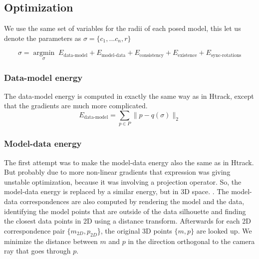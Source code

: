 \subsection{Optimization}

We use the same set of variables for the radii of each posed model, this let us denote the parameters as $\sigma = \{c_1, ... c_n, r\}$ 

\vspace{-5mm}

\begin{equation*}
\sigma =\underset{\sigma}{\operatorname{argmin}} \; E_\text{data-model} + E_\text{model-data} + E_\text{consistency} + E_\text{existence} + E_\text{sync-rotations}
\end{equation*}

\subsubsection{Data-model energy}
The data-model energy is computed in exactly the same way as in Htrack, except that the gradients are much more complicated.
\begin{equation*}
E_\text{data-model} = \underset{p\in P}\sum \| p - q(\sigma)\|_2
\end{equation*}

\subsubsection{Model-data energy}
The first attempt was to make the model-data energy also the same as in Htrack. But probably due to more non-linear gradients that expression was giving unstable optimization, because it was involving a projection operator. So, the model-data energy is replaced by a similar energy, but in 3D space. .
The model-data correspondences are also computed by rendering the model and the data, identifying the model points that are outside of the data silhouette and finding the closest data points in 2D using a distance transform. Afterwards for each 2D correspondence pair $\{m_{2D}, p_{2D}$\}, the original 3D points $\{m, p\}$ are looked up. We minimize the distance between $m$ and $p$ in the direction orthogonal to the camera ray that goes through $p$.

% 

